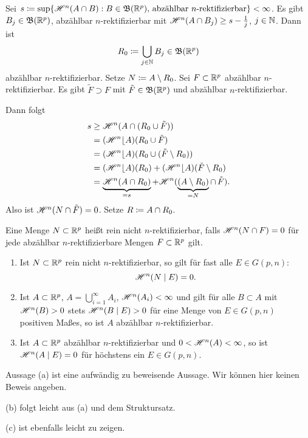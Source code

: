 \documentclass[a4paper,twoside,DIV15,BCOR12mm]{scrbook}
\newcommand{\borel}{\mathfrak B}
\newcommand{\HM}{\H}
\newcommand{\MR}{\lfloor}
\begin{document}
\begin{beweis}
Sei $s\da \sup\{\HM^n(A\cap B): B\in\borel(\MdR^p)\text{, abzählbar $n$-rektifizierbar}\} < \infty$. Es gibt $B_j\in \borel(\MdR^p)$, abzählbar $n$-rektifizierbar mit $\HM^n(A\cap B_j) \ge s-\frac1j$, $j\in \mathbb{N}$. 
Dann ist
\[
R_0 \da \bigcup_{j\in\MdN} B_j \in \borel (\MdR^p)
\]
abzählbar $n$-rektifizierbar. Setze $N\da A\setminus R_0$. Sei $F\subset \mathbb{R}^p$ abzählbar $n$-rektifizierbar. Es gibt $\tilde F \supset F$ mit $\tilde F\in \borel(\MdR^p)$ und abzählbar $n$-rektifizierbar.

Dann folgt
\begin{align*}
s &\ge \HM^n(A\cap (R_0\cup \tilde F)) \\
&=(\HM^n\MR A) (R_0\cup \tilde F) \\
&=(\HM^n\MR A) (R_0\cup (\tilde F\setminus R_0)) \\
&=(\HM^n\MR A) (R_0) + (\HM^n \MR A) (\tilde F\setminus R_0) \\
&=\underbrace{\HM^n(A\cap R_0)}_{=s} + \HM^n( \underbrace{(A\setminus R_0)}_{=N} \mathop{\cap} \tilde F).
\end{align*}
Also ist $\HM^n(N\cap \tilde F)= 0$. Setze $R\da A\cap R_0$.
\end{beweis}

\begin{definition}
Eine Menge $N\subset \mathbb{R}^p$ heißt rein nicht $n$-rektifizierbar, falls $\HM^n(N\cap F)=0$ für jede abzählbar  $n$-rektifizierbare Mengen $F\subset \mathbb{R}^p$ gilt.
\end{definition}

\begin{satz}[Charakterisierungssatz]
\begin{enumerate}[\quad(a)]
\item Ist $N\subset \mathbb{R}^p$ rein nicht $n$-rektifizierbar, so gilt für fast alle $E\in G(p,n)$:
\[
\HM^n(N\mid E) = 0.
\]
\item  Ist $A\subset \mathbb{R}^p$, $A= \bigcup_{i=1}^\infty A_i$, $\HM^n(A_i)<\infty$ und gilt für alle $B\subset A$ mit $\HM^n(B)>0$ stets $\HM^n(B\mid E) > 0$ für eine Menge von $E\in G(p,n)$ positiven Maßes, so ist $A$ abzählbar $n$-rektifizierbar.
\item Ist $A\subset \mathbb{R}^p$ abzählbar $n$-rektifizierbar und $0< \HM^n(A) < \infty$, so ist $\HM^n(A\mid E) = 0$ für höchstens ein $E\in G(p,n)$.
\end{enumerate}
\end{satz}
\begin{beweis}
Aussage (a) ist eine aufwändig zu beweisende Aussage. Wir können hier keinen Beweis angeben. 

(b) folgt leicht aus (a) und dem Struktursatz. 

(c) ist ebenfalls leicht zu zeigen.
\end{beweis}
\end{document}
